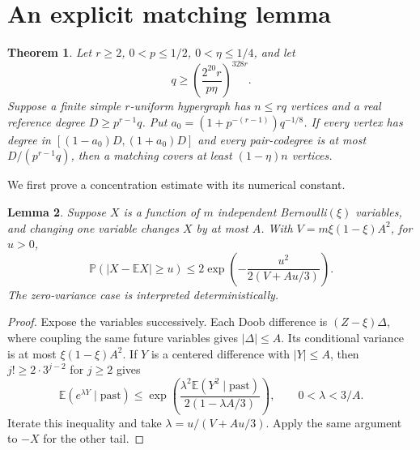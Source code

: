 \documentclass[11pt]{article}
\newtheorem{theorem}{Theorem}[section]
\newtheorem{lemma}[theorem]{Lemma}
\theoremstyle{remark}
\newcommand{\E}{\mathbb E}
\newcommand{\Prob}{\mathbb P}
\begin{document}
\section{An explicit matching lemma}\label{sec:matching}

\begin{theorem}\label{thm:matching}
Let $r\ge2$, $0<p\le1/2$, $0<\eta\le1/4$, and let
\[
 q\ge \left(\frac{2^{20}r}{p\eta}\right)^{328r}.
\]
Suppose a finite simple $r$-uniform hypergraph has $n\le rq$ vertices and
a real reference degree $D\ge p^{r-1}q$. Put
$a_0=(1+p^{-(r-1)})q^{-1/8}$. If every vertex has degree in
$[(1-a_0)D,(1+a_0)D]$ and every pair-codegree is at most
$D/(p^{r-1}q)$, then a matching covers at least $(1-\eta)n$ vertices.
\end{theorem}

We first prove a concentration estimate with its numerical constant.

\begin{lemma}\label{lem:bernstein}
Suppose $X$ is a function of $m$ independent Bernoulli$(\xi)$ variables,
and changing one variable changes $X$ by at most $A$. With
$V=m\xi(1-\xi)A^2$, for $u>0$,
\[
 \Prob(|X-\E X|\ge u)
 \le2\exp\left(-\frac{u^2}{2(V+Au/3)}\right).
\]
The zero-variance case is interpreted deterministically.
\end{lemma}

\begin{proof}
Expose the variables successively. Each Doob difference is
$(Z-\xi)\Delta$, where coupling the same future variables gives
$|\Delta|\le A$. Its conditional variance is at most
$\xi(1-\xi)A^2$. If $Y$ is a centered difference with $|Y|\le A$, then
$j!\ge2\cdot3^{j-2}$ for $j\ge2$ gives
\[
 \E(e^{\lambda Y}\mid\text{past})
 \le\exp\left(
 \frac{\lambda^2\E(Y^2\mid\text{past})}{2(1-\lambda A/3)}\right),
 \qquad 0<\lambda<3/A.
\]
Iterate this inequality and take $\lambda=u/(V+Au/3)$. Apply the same
argument to $-X$ for the other tail.
\end{proof}
\end{document}
